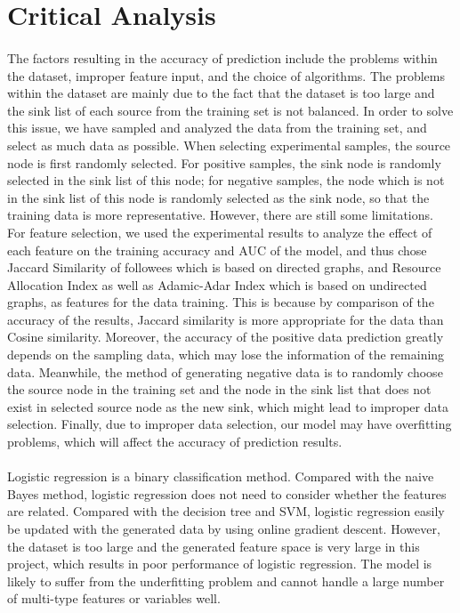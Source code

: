 \documentclass[fleqn,11pt]{olplainarticle}
\begin{document}
\section{Critical Analysis}\label{analysis}
\paragraph*{}
The factors resulting in the accuracy of prediction include the problems within the dataset, improper feature input, and the choice of algorithms. The problems within the dataset are mainly due to the fact that the dataset is too large and the sink list of each source from the training set is not balanced. In order to solve this issue, we have sampled and analyzed the data from the training set, and select as much data as possible. When selecting experimental samples, the source node is first randomly selected. For positive samples, the sink node is randomly selected in the sink list of this node; for negative samples, the node which is not in the sink list of this node is randomly selected as the sink node, so that the training data is more representative. However, there are still some limitations. For feature selection, we used the experimental results to analyze the effect of each feature on the training accuracy and AUC of the model, and thus chose Jaccard Similarity of followees which is based on directed graphs, and Resource Allocation Index as well as Adamic-Adar Index which is based on undirected graphs, as features for the data training. This is because by comparison of the accuracy of the results, Jaccard similarity is more appropriate for the data than Cosine similarity. Moreover, the accuracy of the positive data prediction greatly depends on the sampling data, which may lose the information of the remaining data. Meanwhile, the method of generating negative data is to randomly choose the source node in the training set and the node in the sink list that does not exist in selected source node as the new sink, which might lead to improper data selection. Finally, due to improper data selection, our model may have overfitting problems, which will affect the accuracy of prediction results.
\paragraph*{}
Logistic regression is a binary classification method. Compared with the naive Bayes method, logistic regression does not need to consider whether the features are related. Compared with the decision tree and SVM, logistic regression easily be updated with the generated data by using online gradient descent. However, the dataset is too large and the generated feature space is very large in this project, which results in poor performance of logistic regression. The model is likely to suffer from the underfitting problem and cannot handle a large number of multi-type features or variables well.
\end{document}
